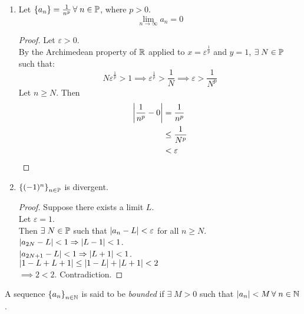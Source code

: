 \documentclass[12pt]{article}
\begin{document}
\begin{example}
    \begin{enumerate}[label=(\alph*)]
        \item Let $\set{a_{n}} = \frac{1}{n^{p}} \,\forall\; n \in \P$, where $p > 0$. \[
            \lim_{n \to \infty} a_{n} = 0
        \]
        \begin{proof}
            Let $\varepsilon > 0$. \\
            By the Archimedean property of $\R$ applied to $x = \varepsilon^{\frac{1}{p}}$ and $y = 1$, $\exists\; N \in \P$ such that: \[
                N \varepsilon^{\frac{1}{p}} > 1 \implies \varepsilon^{\frac{1}{p}} > \frac{1}{N} \implies \varepsilon > \frac{1}{N^{p}}
            \]
            Let $n \geq N$. Then
            \begin{align*}
                \abs{ \frac{1}{n^{p}} - 0 } &= \frac{1}{n^{p}} \\
                                     &\leq \frac{1}{N^{p}} \\
                                     &< \varepsilon \qedhere
            \end{align*}
        \end{proof}

        \item $\set{(-1)^{n}}_{n \in \P}$ is divergent.
        \begin{proof}
            Suppose there exists a limit $L$. \\
            Let $\varepsilon = 1$. \\
            Then $\exists\; N \in \P$ such that $\abs{ a_{n} - L } < \varepsilon$ for all $n \geq N$. \\
            $\abs{ a_{2N} - L } < 1 \implies \abs{ L - 1 } < 1$. \\
            $\abs{ a_{2N + 1} - L } < 1 \implies \abs{ L + 1 } < 1$. \\
            $\abs{ 1 - L + L + 1 } \leq \abs{ 1 - L } + \abs{ L + 1 } < 2$ \\
            $\implies 2 < 2$. Contradiction.
        \end{proof}
    \end{enumerate}
\end{example}

\begin{defn} \label{defn:bounded seq}
    A sequence $\set{a_{n}}_{n \in \N}$ is said to be \emph{bounded} if $\exists\; M > 0$ such that $\abs{ a_{n} } < M \,\forall\; n \in \N$.
\end{defn}
\end{document}

